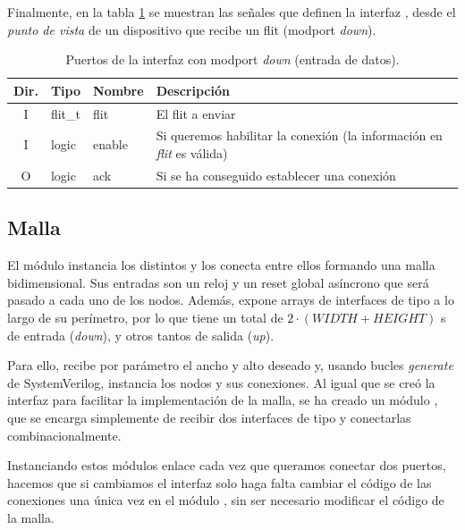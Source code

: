 Finalmente, en la tabla \ref{tab:port_iface_ports} se muestran las señales que definen la interfaz , desde el \textit{punto de vista} de un dispositivo que recibe un flit (modport \textit{down}).

\begin{table}[h]
    \centering
    \footnotesize
    \begin{tabular}{c|l|l|l}
         \hline
         \textbf{Dir.} & \textbf{Tipo} & \textbf{Nombre} & \textbf{Descripción} \\\hline
         I & flit\_t & flit & El flit a enviar \\
         I & logic   & enable & Si queremos habilitar la conexión (la información en \textit{flit} es válida) \\
         O & logic   & ack & Si se ha conseguido establecer una conexión \\\hline
    \end{tabular}
    \caption{Puertos de la interfaz  con modport \textit{down} (entrada de datos).}
    \label{tab:port_iface_ports}
\end{table}

\subsection{Malla}
El módulo  instancia los distintos  y los conecta entre ellos formando una malla bidimensional. Sus entradas son un reloj y un reset global asíncrono que será pasado a cada uno de los nodos. Además, expone arrays de interfaces de tipo  a lo largo de su perímetro, por lo que tiene un total de $2\cdot \left(WIDTH+HEIGHT\right)$ s de entrada (\textit{down}), y otros tantos de salida (\textit{up}).

Para ello, recibe por parámetro el ancho y alto deseado y, usando bucles \textit{generate} de SystemVerilog, instancia los nodos y sus conexiones. Al igual que se creó la interfaz  para facilitar la implementación de la malla, se ha creado un módulo , que se encarga simplemente de recibir dos interfaces de tipo  y conectarlas combinacionalmente. 

Instanciando estos módulos enlace cada vez que queramos conectar dos puertos, hacemos que si cambiamos el interfaz  solo haga falta cambiar el código de las conexiones una única vez en el módulo , sin ser necesario modificar el código de la malla.


